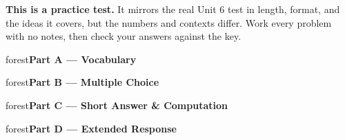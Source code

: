 \documentclass[10pt]{article}
\newcommand{\parthead}[1]{%
  \vspace{6pt}\noindent
  \begin{headlinebox}{forest}\color{white}\bfseries #1\end{headlinebox}%
  \vspace{4pt}}
\begin{document}
\namedateperiod

\vspace{0.10in}
\begin{remindbox}
\small
\textbf{This is a practice test.} It mirrors the real Unit 6 test in length, format,
and the ideas it covers, but the numbers and contexts differ. Work every problem
with no notes, then check your answers against the key.
\end{remindbox}

\parthead{Part A --- Vocabulary}

\parthead{Part B --- Multiple Choice}

\parthead{Part C --- Short Answer \& Computation}

\parthead{Part D --- Extended Response}
\end{document}
